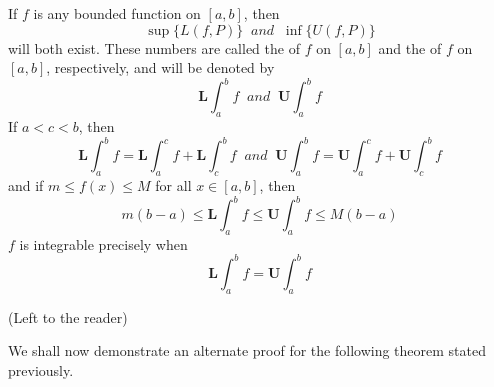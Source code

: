 \documentclass[12pt]{report}
\begin{document}
\begin{rmk}{}{}
    If $f$ is any bounded function on $[a,b]$, then \begin{equation}
        \sup\{L(f,P)\}\;\;and\;\;\inf\{U(f,P)\}
    \end{equation}
    will both exist. These numbers are called the  of $f$ on $[a,b]$ and the  of $f$ on $[a,b]$, respectively, and will be denoted by \begin{equation}
        \mathbf{L}\int_a^bf\;\;and\;\;\mathbf{U}\int_a^bf
    \end{equation}
    If $a < c < b$, then \begin{equation}
        \mathbf{L}\int_a^bf = \mathbf{L}\int_a^cf + \mathbf{L}\int_c^bf\;\;and\;\;\mathbf{U}\int_a^bf = \mathbf{U}\int_a^cf + \mathbf{U}\int_c^bf
    \end{equation}
    and if $m \leq f(x) \leq M$ for all $x \in [a,b]$, then \begin{equation}
        m(b-a)\leq \mathbf{L}\int_a^bf \leq \mathbf{U}\int_a^bf\leq M(b-a)
    \end{equation}
    $f$ is integrable precisely when \begin{equation}
        \mathbf{L}\int_a^bf = \mathbf{U}\int_a^bf
    \end{equation}
\end{rmk}
\begin{proof*}{}{}
    (Left to the reader)
\end{proof*}


\begin{rmk}{}{}
    We shall now demonstrate an alternate proof for the following theorem stated previously.
\end{rmk}
\end{document}
